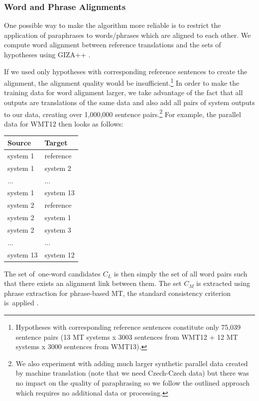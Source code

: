 \subsubsection{Word and Phrase Alignments}
\label{alignments}
One possible way to make the algorithm more reliable is to restrict the application of paraphrases to words/phrases which are aligned to each other. 
We compute word alignment between reference translations and the sets of hypotheses using GIZA++ \citep{gizapp}.

If we used only hypotheses with corresponding reference sentences to create the alignment, 
the alignment quality would be insufficient.\footnote{Hypotheses with corresponding reference 
sentences constitute only 75,039 sentence pairs (13 MT systems x 3003 sentences from WMT12 + 
12 MT systems x 3000 sentences from WMT13).} 
In order to make the training data for word alignment larger, 
we take advantage of the fact that all outputs are translations of the same data and also add all pairs of system outputs to our data, creating over 1,000,000  sentence pairs.\footnote{We also experiment with adding much larger synthetic parallel data created by 
machine translation  (note that we need Czech-Czech data) but there was no 
impact on the quality of paraphrasing so we follow the outlined approach which 
requires no additional data or processing.} For example, the parallel data for 
WMT12 then looks as follows:

\begin{center}
\begin{tabular}{ll}
Source & Target \\
\hline
system 1 & reference \\
system 1 & system 2 \\
... & ...\\
system 1 & system 13 \\
system 2 & reference \\
system 2 & system 1 \\
system 2 & system 3 \\
... & ... \\
system 13 & system 12 \\
\end{tabular}
\end{center}

The set of~one-word candidates $C_L$ is then simply the set of all word pairs such
that there exists an alignment link between them. The set $C_M$ is extracted 
using phrase extraction for phrase-based MT, the standard consistency criterion
is~applied \citep{Och99improvedalignment}.

